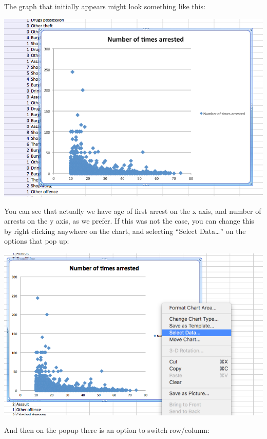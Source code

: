 \documentclass[
]{book}
\begin{document}
The graph that initially appears might look something like this:

\includegraphics{imgs/scatter_3.png}

You can see that actually we have age of first arrest on the x axis, and number of arrests on the y axis, as we prefer. If this was not the case, you can change this by right clicking anywhere on the chart, and selecting ``Select Data\ldots{}'' on the options that pop up:

\includegraphics{imgs/scatter_4.png}

And then on the popup there is an option to switch row/column:
\end{document}
